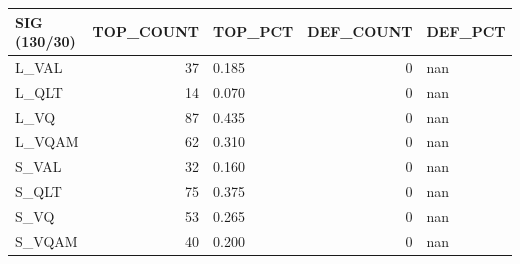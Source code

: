 \begin{tabular}{lrlrl}
\toprule
SIG (130/30) & TOP\_COUNT & TOP\_PCT & DEF\_COUNT & DEF\_PCT \\
\midrule
L\_VAL & 37 & 0.185 & 0 & nan \\
L\_QLT & 14 & 0.070 & 0 & nan \\
L\_VQ & 87 & 0.435 & 0 & nan \\
L\_VQAM & 62 & 0.310 & 0 & nan \\
S\_VAL & 32 & 0.160 & 0 & nan \\
S\_QLT & 75 & 0.375 & 0 & nan \\
S\_VQ & 53 & 0.265 & 0 & nan \\
S\_VQAM & 40 & 0.200 & 0 & nan \\
\bottomrule
\end{tabular}
